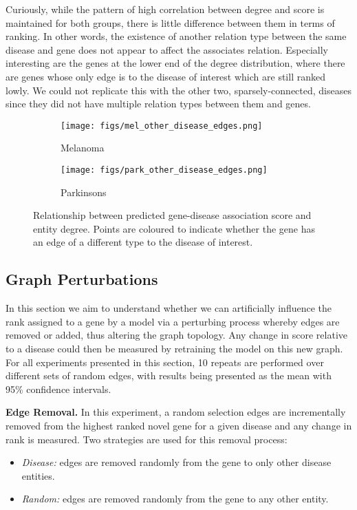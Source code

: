 Curiously, while the pattern of high correlation between degree and score is maintained for both groups, there is little difference between them in terms of ranking. In other words, the existence of another relation type between the same disease and gene does not appear to affect the associates relation. Especially interesting are the genes at the lower end of the degree distribution, where there are genes whose only edge is to the disease of interest which are still ranked lowly. We could not replicate this with the other two, sparsely-connected, diseases since they did not have multiple relation types between them and genes.

\begin{figure*}[!ht]
	\centering
	\begin{subfigure}[b]{0.48\textwidth}
		\centering
		\texttt{[image: figs/mel\_other\_disease\_edges.png]}
		\caption{Melanoma}\label{fig:disease:mel}
	\end{subfigure}
	\begin{subfigure}[b]{0.48\textwidth}
		\centering
		\texttt{[image: figs/park\_other\_disease\_edges.png]}
		\caption{Parkinsons}\label{fig:disease:park}
	\end{subfigure}
	\caption{Relationship between predicted gene-disease association score and entity degree. Points are coloured to indicate whether the gene has an edge of a different type to the disease of interest.}
	\label{fig:disease-other-edge}
\end{figure*}

\subsection{Graph Perturbations}
\label{ssec:graph-perturbations}

In this section we aim to understand whether we can artificially influence the rank assigned to a gene by a model via a perturbing process whereby edges are removed or added, thus altering the graph topology. Any change in score relative to a disease could then be measured by retraining the model on this new graph. For all experiments presented in this section, 10 repeats are performed over different sets of random edges, with results being presented as the mean with 95\% confidence intervals.

\textbf{Edge Removal.} In this experiment, a random selection edges are incrementally removed from the highest ranked novel gene for a given disease and any change in rank is measured. Two strategies are used for this removal process:
\begin{itemize}
	\item \emph{Disease:} edges are removed randomly from the gene to only other disease entities.
	\item \emph{Random:} edges are removed randomly from the gene to any other entity.
\end{itemize}

